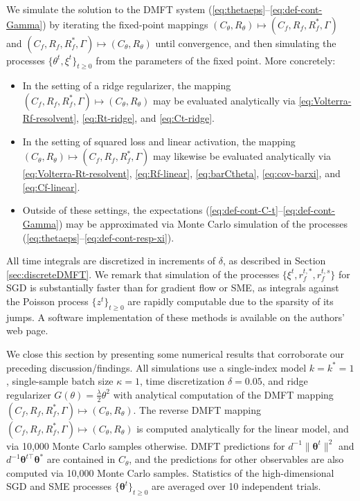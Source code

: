 \documentclass[11pt,letterpaper,reqno]{amsart}
\theoremstyle{definition}
\def\btheta{\boldsymbol{\theta}}
\begin{document}
We simulate the solution to the DMFT
system (\ref{eq:thetaeps}--\ref{eq:def-cont-Gamma}) by iterating the fixed-point
mappings $(C_\theta,R_\theta) \mapsto (C_f,R_f,R^*_f,\Gamma)$
and $(C_f,R_f,R^*_f,\Gamma) \mapsto (C_\theta,R_\theta)$ until convergence, and
then simulating the processes $\{\theta^t,\xi^t\}_{t \geq 0}$ from the
parameters of the fixed point. More concretely:
\begin{itemize}
\item In the setting of a ridge regularizer, the mapping
$(C_f,R_f,R^*_f,\Gamma) \mapsto (C_\theta,R_\theta)$ may be evaluated
analytically via \eqref{eq:Volterra-Rf-resolvent}, \eqref{eq:Rt-ridge}, and
\eqref{eq:Ct-ridge}.
\item In the setting of squared loss and linear activation, the mapping
$(C_\theta,R_\theta) \mapsto (C_f,R_f,R^*_f,\Gamma)$ may likewise be evaluated
analytically via \eqref{eq:Volterra-Rt-resolvent},
\eqref{eq:Rf-linear}, \eqref{eq:barCtheta}, \eqref{eq:cov-barxi},
and \eqref{eq:Cf-linear}.
\item Outside of these settings, the expectations
(\ref{eq:def-cont-C-t}--\ref{eq:def-cont-Gamma}) may be approximated
via Monte Carlo simulation of the processes
(\ref{eq:thetaeps}--\ref{eq:def-cont-resp-xi}).
\end{itemize}
All time integrals are discretized in increments of $\delta$, as described in
Section \ref{sec:discreteDMFT}. We remark that simulation of the processes
$\{\xi^t,r_f^{t,*},r_f^{t,s}\}$ for SGD is substantially faster
than for gradient flow or SME, as integrals against the Poisson
process $\{z^t\}_{t \geq 0}$ are rapidly computable due to the sparsity of its
jumps. A software implementation of these methods is available on the authors'
web page.

We close this section by presenting some numerical results that corroborate our
preceding discussion/findings. All simulations use a single-index model
$k=k^*=1$, single-sample batch size $\kappa=1$, time discretization $\delta=0.05$, 
and ridge regularizer $G(\theta)=\frac{\lambda}{2}\theta^2$ with
analytical computation of the DMFT mapping
$(C_f,R_f,R^*_f,\Gamma) \mapsto (C_\theta,R_\theta)$. The reverse DMFT mapping $(C_f,R_f,R^*_f,\Gamma) \mapsto (C_\theta,R_\theta)$ is
computed analytically for the linear model, and via 10,000 Monte Carlo samples
otherwise. DMFT predictions for $d^{-1}\|\btheta^t\|^2$ and $d^{-1}\btheta^{t\top}\btheta^*$ are contained in $C_\theta$, and the predictions for other observables are also computed via 10,000 Monte Carlo samples. Statistics of the high-dimensional SGD and SME processes
$\{\btheta^t\}_{t \geq 0}$ are averaged over 10 independent trials.\\
\end{document}
